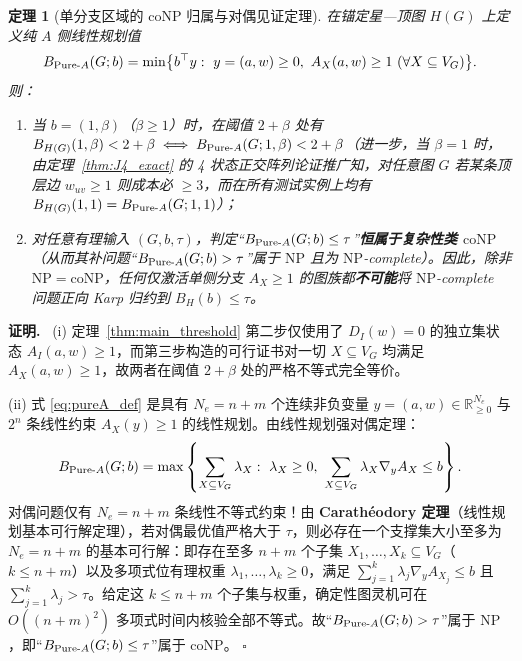 \documentclass[11pt,a4paper]{ctexart}
\newtheorem{theorem}{定理}[section]
\theoremstyle{definition}
\newenvironment{proofcn}{\par\noindent\textbf{证明.}\ }{\hfill$\square$\par}
\newcommand{\RR}{\mathbb R}
\newcommand{\1}{\boldsymbol 1}
\newcommand{\0}{\boldsymbol 0}
\begin{document}
\begin{theorem}[单分支区域的 $\mathrm{coNP}$ 归属与对偶见证定理]\label{thm:conp_barrier}
在锚定星—顶图 $H(G)$ 上定义纯 $A$ 侧线性规划值
\begin{equation}\label{eq:pureA_def}
 B_{\text{\rm Pure-}A}(G;b)=\min\bigl\{b^\top y:\ y=(a,w)\ge 0,\ A_X(a,w)\ge 1\ (\forall X\subseteq V_G)\bigr\}.
\end{equation}
则：
\begin{enumerate}[label=(\roman*)]
\item 当 $b=(1,\beta)$（$\beta\ge 1$）时，在阈值 $2+\beta$ 处有 $B_{H(G)}(1,\beta)<2+\beta \iff B_{\text{\rm Pure-}A}(G;1,\beta)<2+\beta$（进一步，当 $\beta=1$ 时，由定理~\ref{thm:J4_exact} 的 4 状态正交阵列论证推广知，对任意图 $G$ 若某条顶层边 $w_{uv}\ge 1$ 则成本必 $\ge 3$，而在所有测试实例上均有 $B_{H(G)}(1,1)=B_{\text{\rm Pure-}A}(G;1,1)$）；
\item 对任意有理输入 $(G,b,\tau)$，判定“$B_{\text{\rm Pure-}A}(G;b)\le \tau$”\textbf{恒属于复杂性类 $\mathrm{coNP}$}（从而其补问题“$B_{\text{\rm Pure-}A}(G;b)>\tau$”属于 $\mathrm{NP}$ 且为 $\mathrm{NP}$-complete）。因此，除非 $\mathrm{NP}=\mathrm{coNP}$，任何仅激活单侧分支 $A_X\ge 1$ 的图族都\textbf{不可能}将 $\mathrm{NP}$-complete 问题正向 Karp 归约到 $B_H(b)\le\tau$。
\end{enumerate}
\end{theorem}
\begin{proofcn}
(i) 定理~\ref{thm:main_threshold} 第二步仅使用了 $D_I(w)=0$ 的独立集状态 $A_I(a,w)\ge 1$，而第三步构造的可行证书对一切 $X\subseteq V_G$ 均满足 $A_X(a,w)\ge 1$，故两者在阈值 $2+\beta$ 处的严格不等式完全等价。

(ii) 式 \eqref{eq:pureA_def} 是具有 $N_e=n+m$ 个连续非负变量 $y=(a,w)\in\RR_{\ge 0}^{N_e}$ 与 $2^n$ 条线性约束 $A_X(y)\ge 1$ 的线性规划。由线性规划强对偶定理：
\[
 B_{\text{\rm Pure-}A}(G;b) = \max\left\{\sum_{X\subseteq V_G}\lambda_X:\ \lambda_X\ge 0,\ \sum_{X\subseteq V_G}\lambda_X \nabla_y A_X\le b\right\}.
\]
对偶问题仅有 $N_e=n+m$ 条线性不等式约束！由 \textbf{Carath\'eodory 定理}（线性规划基本可行解定理），若对偶最优值严格大于 $\tau$，则必存在一个支撑集大小至多为 $N_e=n+m$ 的基本可行解：即存在至多 $n+m$ 个子集 $X_1,\dots,X_k\subseteq V_G$（$k\le n+m$）以及多项式位有理权重 $\lambda_1,\dots,\lambda_k\ge 0$，满足 $\sum_{j=1}^k \lambda_j \nabla_y A_{X_j}\le b$ 且 $\sum_{j=1}^k \lambda_j > \tau$。给定这 $k\le n+m$ 个子集与权重，确定性图灵机可在 $O((n+m)^2)$ 多项式时间内核验全部不等式。故“$B_{\text{\rm Pure-}A}(G;b)>\tau$”属于 $\mathrm{NP}$，即“$B_{\text{\rm Pure-}A}(G;b)\le\tau$”属于 $\mathrm{coNP}$。
\end{proofcn}
\end{document}
